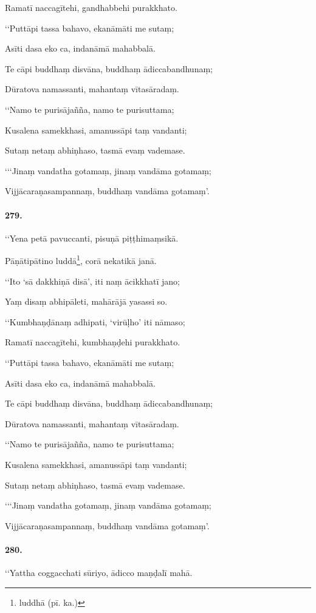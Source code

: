 Ramatī naccagītehi, gandhabbehi purakkhato.

‘‘Puttāpi tassa bahavo, ekanāmāti me sutaṃ;

Asīti dasa eko ca, indanāmā mahabbalā.

Te cāpi buddhaṃ disvāna, buddhaṃ ādiccabandhunaṃ;

Dūratova namassanti, mahantaṃ vītasāradaṃ.

‘‘Namo te purisājañña, namo te purisuttama;

Kusalena samekkhasi, amanussāpi taṃ vandanti;

Sutaṃ netaṃ abhiṇhaso, tasmā evaṃ vademase.

‘‘‘Jinaṃ vandatha gotamaṃ, jinaṃ vandāma gotamaṃ;

Vijjācaraṇasampannaṃ, buddhaṃ vandāma gotamaṃ’.

\paragraph{279.} ‘‘Yena petā pavuccanti, pisuṇā piṭṭhimaṃsikā.

Pāṇātipātino luddā\footnote{luddhā (pī. ka.)}, corā nekatikā janā.

‘‘Ito ‘sā dakkhiṇā disā’, iti naṃ ācikkhatī jano;

Yaṃ disaṃ abhipāleti, mahārājā yasassi so.

‘‘Kumbhaṇḍānaṃ adhipati, ‘virūḷho’ iti nāmaso;

Ramatī naccagītehi, kumbhaṇḍehi purakkhato.

‘‘Puttāpi tassa bahavo, ekanāmāti me sutaṃ;

Asīti dasa eko ca, indanāmā mahabbalā.

Te cāpi buddhaṃ disvāna, buddhaṃ ādiccabandhunaṃ;

Dūratova namassanti, mahantaṃ vītasāradaṃ.

‘‘Namo te purisājañña, namo te purisuttama;

Kusalena samekkhasi, amanussāpi taṃ vandanti;

Sutaṃ netaṃ abhiṇhaso, tasmā evaṃ vademase.

‘‘‘Jinaṃ vandatha gotamaṃ, jinaṃ vandāma gotamaṃ;

Vijjācaraṇasampannaṃ, buddhaṃ vandāma gotamaṃ’.

\paragraph{280.} ‘‘Yattha coggacchati sūriyo, ādicco maṇḍalī mahā.

